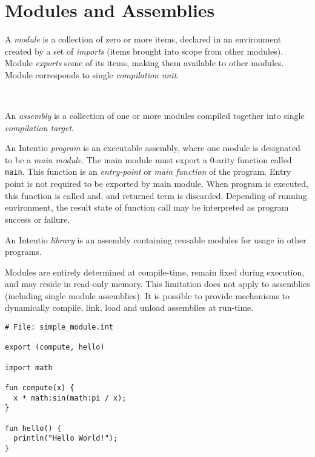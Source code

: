 \chapter{Modules and Assemblies}

A \emph{module} is a collection of zero or more items, declared in an environment created by a set of \emph{imports} (items brought into scope from other modules). Module \emph{exports} some of its items, making them available to other modules. Module corresponds to single \emph{compilation unit}.

\begin{bnf}
   \eq {} \ 
\end{bnf}

An \emph{assembly} is a collection of one or more modules compiled together into single \emph{compilation target}.

An Intentio \emph{program} is an executable assembly, where one module is designated to be a \emph{main module}. The main module must export a 0-arity function called \lstinline{main}. This function is an \emph{entry-point} or \emph{main function} of the program. Entry point is not required to be exported by main module. When program is executed, this function is called and, and returned term is discarded. Depending of running environment, the result state of function call may be interpreted as program success or failure.

An Intentio \emph{library} is an assembly containing reusable modules for usage in other programs.

Modules are entirely determined at compile-time, remain fixed during execution, and may reside in read-only memory. This limitation does not apply to assemblies (including single module assemblies). It is possible to provide mechanisms to dynamically compile, link, load and unload assemblies at run-time.

\begin{example}
\begin{lstlisting}
# File: simple_module.int

export (compute, hello)

import math

fun compute(x) {
  x * math:sin(math:pi / x);
}

fun hello() {
  println("Hello World!");
}
\end{lstlisting}
\end{example}

